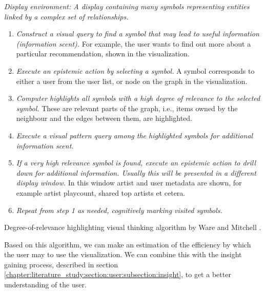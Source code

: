 \begin{table}
	\textit{Display environment: A display containing many symbols representing entities linked by a complex set of relationships.}

	\begin{enumerate}
		\item \textit{Construct a visual query to find a symbol that may lead to useful information (information scent).} For example, the user wants to find out more about a particular recommendation, shown in the visualization.
		\item \textit{Execute an epistemic action by selecting a symbol.} A symbol corresponds to either a user from the user list, or node on the graph in the visualization.
		\item \textit{Computer highlights all symbols with a high degree of relevance to the selected symbol.} These are relevant parts of the graph, i.e., items owned by the neighbour and the edges between them, are highlighted.
		\item \textit{Execute a visual pattern query among the highlighted symbols for additional information scent.}
		\item \textit{If a very high relevance symbol is found, execute an epistemic action to drill down for additional information. Usually this will be presented in a different display window.} In this window artist and user metadata are shown, for example artist playcount, shared top artists et cetera.
		\item \textit{Repeat from step 1 as needed, cognitively marking visited symbols.}
	\end{enumerate}
\caption{Degree-of-relevance highlighting visual thinking algorithm by Ware and Mitchell \cite{ware:2004}.}
\label{table:visual_thinking_algorithm}
\end{table}

Based on this algorithm, we can make an estimation of the efficiency by which the user may to use the visualization. We can combine this with the insight gaining process, described in section \ref{chapter:literature_study:section:user:subsection:insight}, to get a better understanding of the user.



































